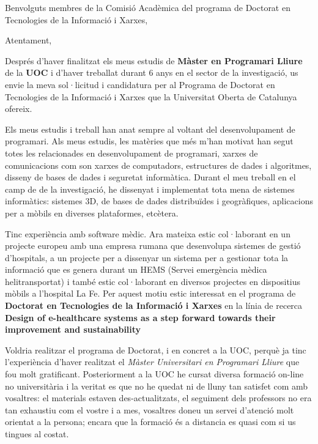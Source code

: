 
%
%


\date{\today}
\opening{Benvolguts membres de la Comisió Acadèmica del programa de Doctorat en Tecnologies de la Informació i Xarxes,}
\closing{Atentament,}




\makelettertitle

Després d'haver finalitzat els meus estudis de \textbf{Màster en Programari Lliure} de la \textbf{UOC} i d'haver treballat durant 6 anys en el sector de la investigació, us envie la meva sol·licitud i candidatura per al Programa de Doctorat en Tecnologies de la Informació i Xarxes que la Universitat Oberta de Catalunya ofereix.

Els meus estudis i treball han anat sempre al voltant del desenvolupament de programari. Als meus estudis, les matèries que més m'han motivat han segut totes les relacionades en desenvolupament de programari, xarxes de comunicacions com son xarxes de computadors, estructures de dades i algoritmes, disseny de bases de dades i seguretat informàtica. Durant el meu treball en el camp de de la investigació, he dissenyat i implementat tota mena de sistemes informàtics: sistemes 3D, de bases de dades distribuïdes i geogràfiques, aplicacions per a mòbils en diverses plataformes, etcètera.

Tinc experiència amb software mèdic. Ara mateixa estic col·laborant en un projecte europeu amb una empresa rumana que desenvolupa sistemes de gestió d'hospitals, a un projecte per a dissenyar un sistema per a gestionar tota la informació que es genera durant un HEMS (Servei emergència mèdica helitransportat) i també estic col·laborant en diversos projectes en dispositius mòbils a l'hospital La Fe.  Per aquest motiu estic interessat en el programa de \textbf{Doctorat en Tecnologies de la Informació i Xarxes} en la línia de recerca \textbf{Design of e-healthcare systems as a step forward towards their improvement and sustainability} 

Voldria realitzar el programa de Doctorat, i en concret a la UOC, perquè ja tinc l'experiència d'haver realitzat el \textit{Màster Universitari en Programari Lliure} que fou molt gratificant. Posteriorment a la UOC he cursat diversa formació on-line no universitària i la veritat es que no he quedat ni de lluny tan satisfet com amb vosaltres: el materials estaven des-actualitzats, el seguiment dels professors no era tan exhaustiu com el vostre i a mes, vosaltres doneu un servei d'atenció molt orientat a la persona; encara que la formació és a distancia es quasi com si us tingues al costat. 


\makeletterclosing

\clearpage